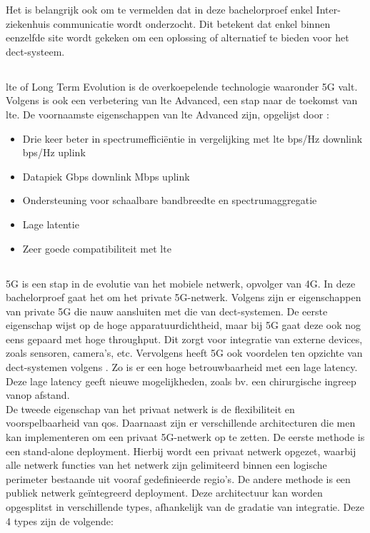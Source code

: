 Het is belangrijk ook om te vermelden dat in deze bachelorproef enkel Inter-ziekenhuis communicatie wordt onderzocht. Dit betekent dat enkel binnen eenzelfde site wordt gekeken om een oplossing of alternatief te bieden voor het \gls{dect}-systeem.
\subsection{}%
\label{sec:ltea}%

\gls{lte} of Long Term Evolution is de overkoepelende technologie waaronder 5G valt. Volgens \textcite{Bakare2022} is ook een verbetering van \gls{lte} Advanced, een stap naar de toekomst van \gls{lte}. De voornaamste eigenschappen van \gls{lte} Advanced zijn, opgelijst door \textcite{Bakare2022}:

\begin{itemize}
  \item Drie keer beter in spectrumefficiëntie in vergelijking met \gls{lte}
   bps/Hz downlink
   bps/Hz uplink
  \item Datapiek 
   Gbps downlink
   Mbps uplink
  \item Ondersteuning voor schaalbare bandbreedte en spectrumaggregatie
  \item Lage latentie
  \item Zeer goede compatibiliteit met \gls{lte}
\end{itemize}

\subsection{}%
\label{sec:5g}%
5G is een stap in de evolutie van het mobiele netwerk, opvolger van 4G. In deze bachelorproef gaat het om het private 5G-netwerk. Volgens \textcite{wen2021private} zijn er eigenschappen van private 5G die nauw aansluiten met die van \gls{dect}-systemen. De eerste eigenschap wijst op de hoge apparatuurdichtheid, maar bij 5G gaat deze ook nog eens gepaard met hoge throughput. Dit zorgt voor integratie van externe devices, zoals sensoren, camera's, etc. Vervolgens heeft 5G ook voordelen ten opzichte van \gls{dect}-systemen volgens \textcite{wen2021private}. Zo is er een hoge betrouwbaarheid met een lage latency. Deze lage latency geeft nieuwe mogelijkheden, zoals bv. een chirurgische ingreep vanop afstand.\\ De tweede eigenschap van het privaat netwerk is de flexibiliteit en voorspelbaarheid van \gls{qos}. Daarnaast zijn er verschillende architecturen die men kan implementeren om een privaat 5G-netwerk op te zetten. De eerste methode is een stand-alone deployment. Hierbij wordt een privaat netwerk opgezet, waarbij alle netwerk functies van het netwerk zijn gelimiteerd binnen een logische perimeter bestaande uit vooraf gedefinieerde regio's. De andere methode is een publiek netwerk geïntegreerd deployment. Deze architectuur kan worden opgesplitst in verschillende types, afhankelijk van de gradatie van integratie. Deze 4 types zijn de volgende:

